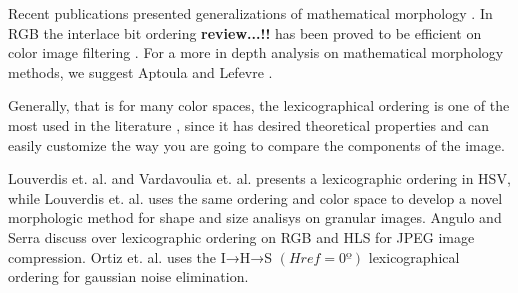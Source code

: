 Recent publications presented generalizations of mathematical morphology \cite{ledoux2012limits, van2013group, velasco2012random, lezoray2009learning, velasco2010morphological, burgeth2013morphology, velasco2011supervised, hanbury2001morphological, angulo2010pseudo, aptoula2008alpha, kleefeld2015processing, vazquez2014color}. In RGB the interlace bit ordering \textbf{review...!!} has been proved to be efficient on color image filtering \cite{chanussot1997bit}. For a more in depth analysis on mathematical morphology methods, we suggest Aptoula and Lefevre \cite{apatoula2007comparative}. %


Generally, that is for many color spaces, the lexicographical ordering is one of the most used in the literature \cite{aptoula2007comparative, aptoula2008lexicographical}, since it has desired theoretical properties and can easily customize the way you are going to compare the components of the image. 

Louverdis et. al. \cite{louverdis2002new} and Vardavoulia et. al. \cite{vardavoulia2002vector} presents a lexicographic ordering in HSV, while Louverdis et. al. \cite{louverdis2002morphological} uses the same ordering and color space to develop a novel morphologic method for shape and size analisys on granular images. Angulo and Serra \cite{angulo2003morphological} discuss over lexicographic ordering on RGB and HLS for JPEG image compression. Ortiz et. al. \cite{ortiz2004morphological} uses the I→H→S $(Href=0º)$ lexicographical ordering for gaussian noise elimination.

